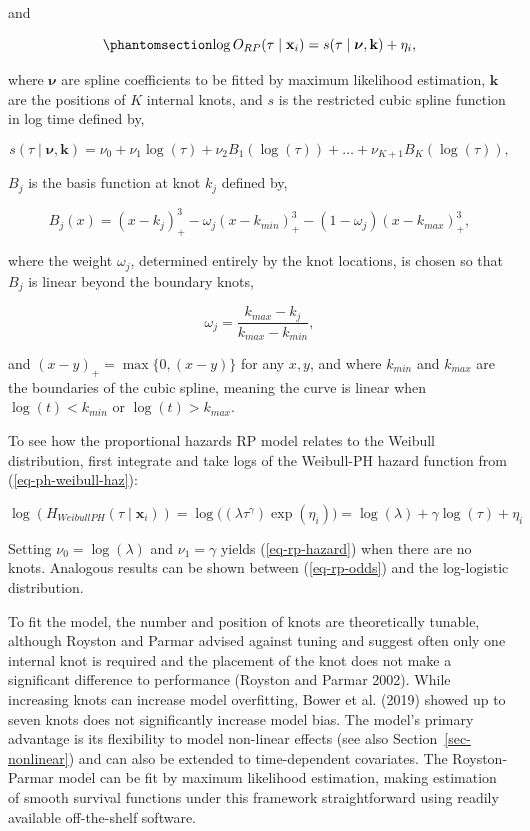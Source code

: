 \documentclass[
  letterpaper,
  krantz2]{style/krantz}
\begin{document}
and

\begin{equation}\phantomsection\label{eq-rp-odds}{
\log{O}_{RP}(\tau \mid \mathbf{x}_i) = s(\tau \mid \boldsymbol{\nu},\mathbf{k}) + \eta_i,
}\end{equation}

where \(\boldsymbol{\nu}\) are spline coefficients to be fitted by
maximum likelihood estimation, \(\mathbf{k}\) are the positions of \(K\)
internal knots, and \(s\) is the restricted cubic spline function in log
time defined by, 

\[
s(\tau \mid \boldsymbol{\nu},\mathbf{k}) = \nu_0 + \nu_1\log(\tau) + \nu_2 B_1(\log(\tau)) + \ldots + \nu_{K+1} B_K(\log(\tau)),
\]

\(B_j\) is the basis function at knot \(k_j\) defined
by,

\[
B_j(x) = (x - k_j)^3_+ - \omega_j(x - k_{min})^3_+ - (1 - \omega_j)(x - k_{max})^3_+,
\]

where the weight \(\omega_j\), determined entirely by the knot
locations, is chosen so that \(B_j\) is linear beyond the boundary
knots,

\[
\omega_j = \frac{k_{max} - k_j}{k_{max} - k_{min}},
\]

and \((x - y)_+ = \max\{0, (x - y)\}\) for any \(x, y\), and where
\(k_{min}\) and \(k_{max}\) are the boundaries of the cubic spline,
meaning the curve is linear when \(\log(t) < k_{min}\) or
\(\log(t) > k_{max}\).

To see how the proportional hazards RP model relates to the Weibull
distribution, first integrate and take logs of the Weibull-PH hazard
function from (\ref{eq-ph-weibull-haz}):

\[
\log(H_{WeibullPH}(\tau \mid \mathbf{x}_i)) = \log\big((\lambda \tau^\gamma) \exp(\eta_i)\big) = \log(\lambda) + \gamma\log(\tau) + \eta_i
\]

Setting \(\nu_0 = \log(\lambda)\) and \(\nu_1 = \gamma\) yields
(\ref{eq-rp-hazard}) when there are no knots. Analogous results can be
shown between (\ref{eq-rp-odds}) and the log-logistic distribution.

To fit the model, the number and position of knots are theoretically
tunable, although Royston and Parmar advised against tuning and suggest
often only one internal knot is required and the placement of the knot
does not make a significant difference to performance (Royston and
Parmar 2002).  While increasing knots
can increase model overfitting, Bower et al. (2019) showed up to seven
knots does not significantly increase model bias. The model's primary
advantage is its flexibility to model non-linear effects (see also
Section~\ref{sec-nonlinear}) and can also be extended to time-dependent
covariates. The Royston-Parmar model can be fit by maximum likelihood
estimation, making estimation of smooth survival functions under this
framework straightforward using readily available off-the-shelf
software.
\end{document}
